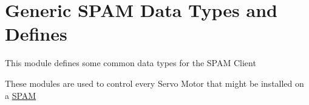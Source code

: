 \hypertarget{group___b_r_o_s_p_a_m_client}{
\section{Generic SPAM Data Types and Defines}
\label{group___b_r_o_s_p_a_m_client}
}
This module defines some common data types for the SPAM Client

These modules are used to control every Servo Motor that might be installed on a \hyperlink{main_SPAM}{SPAM} 